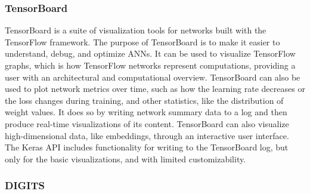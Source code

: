\subsubsection{TensorBoard}

\begin{comment}
\textit{TensorBoard is a suite of visualization tools for TensorFlow programs. The purpose of TensorBoard is to make it easier to understand, debug, and optimize artificial neural networks. It can be used to visualize TensorFlow graphs, which is TensorFlow's way of representing computations. It can also be used to plot network metrics, such as how the learning rate varies over time, or how the loss function is changing. This is done by annotating the nodes of the graph with so called summary operations, that writes summary data to a log. TensorBoard then reads this log, in order to generate real-time visualizations. The visualizations are mostly restricted to plots, histograms and visualizations of the network architecture. However, it can also visualize high-dimensional data like embeddings, with a very interactive user interface. Functionality for writing to the TensorBoard log is also included in Keras, but only for the basic visualizations, and with limited customizability.}
\end{comment}

TensorBoard is a suite of visualization tools for networks built with the TensorFlow framework. The purpose of TensorBoard is to make it easier to understand, debug, and optimize ANNs. It can be used to visualize TensorFlow graphs, which is how TensorFlow networks represent computations, providing a user with an architectural and computational overview. TensorBoard can also be used to plot network metrics over time, such as how the learning rate decreases or the loss changes during training, and other statistics, like the distribution of weight values. It does so by writing network summary data to a log and then produce real-time visualizations of its content. TensorBoard can also visualize high-dimensional data, like embeddings, through an interactive user interface. The Keras API includes functionality for writing to the TensorBoard log, but only for the basic visualizations, and with limited customizability.

\begin{comment}
Drawbacks:
- No managing of networks.
- No advanced visualizations.
\end{comment}

\subsubsection{DIGITS}

